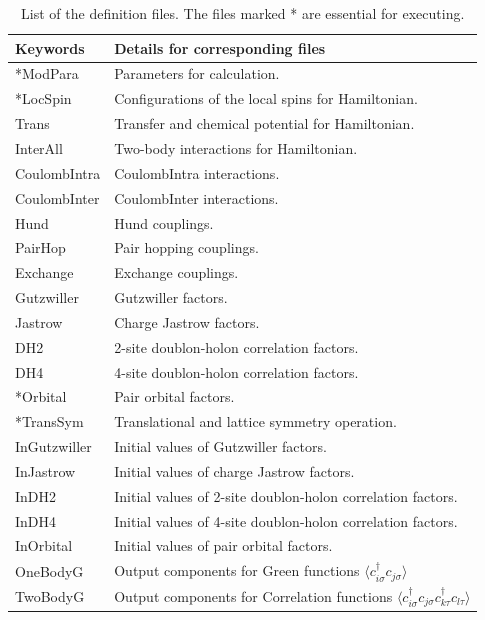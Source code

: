  \begin{table}[h!]
\begin{center}
  \begin{tabular}{|ll|} \hline
           Keywords     & Details for corresponding files       \\   \hline\hline
           *ModPara       &  Parameters for calculation.        \\ \hline 
           *LocSpin         &  Configurations of the local spins for Hamiltonian.         \\ 
           Trans       &   Transfer and chemical potential for Hamiltonian.  \\
           InterAll  &   Two-body interactions for Hamiltonian. \\  
           CoulombIntra  &   CoulombIntra interactions. \\  
           CoulombInter  &   CoulombInter  interactions. \\  
           Hund  &   Hund couplings. \\  
           PairHop  &  Pair hopping couplings. \\  
           Exchange  &  Exchange couplings. \\  \hline
           Gutzwiller & Gutzwiller factors.\\
           Jastrow & Charge Jastrow factors.\\
           DH2 & 2-site doublon-holon correlation factors.\\
           DH4 & 4-site doublon-holon correlation factors.\\
           *Orbital & Pair orbital factors.\\
           *TransSym & Translational and lattice symmetry operation. \\ \hline
           InGutzwiller & Initial values of Gutzwiller factors.\\
           InJastrow & Initial values of charge Jastrow factors.\\
           InDH2 & Initial values of 2-site doublon-holon correlation factors.\\
           InDH4 & Initial values of 4-site doublon-holon correlation factors.\\
           InOrbital & Initial values of pair orbital factors.\\ \hline
           OneBodyG         &   Output components for Green functions $\langle c_{i\sigma}^{\dagger}c_{j\sigma}\rangle$           \\   
           TwoBodyG &   Output components for Correlation functions $\langle c_{i\sigma}^{\dagger}c_{j\sigma}c_{k\tau}^{\dagger}c_{l\tau}\rangle$  \\   \hline
  \end{tabular}
\end{center}
\caption{List of the definition files. The files marked * are essential for executing.}
\label{Table:Defs}
\end{table}%

